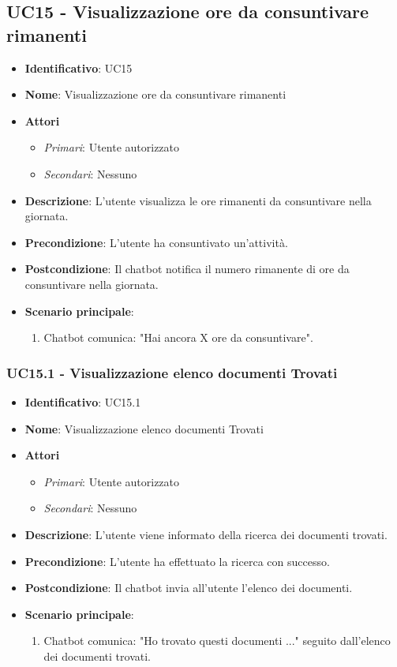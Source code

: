 \subsection{UC15 - Visualizzazione ore da consuntivare rimanenti }
\begin{itemize}
	\item \textbf{Identificativo}: UC15
	\item \textbf{Nome}: Visualizzazione ore da consuntivare rimanenti
	\item \textbf{Attori}
	\begin{itemize} 
		\item \textit{Primari}: Utente autorizzato
		\item \textit{Secondari}: Nessuno
	\end{itemize}
	\item \textbf{Descrizione}: L'utente visualizza le ore rimanenti da consuntivare nella giornata.
	\item \textbf{Precondizione}: L'utente ha consuntivato un'attività.
	\item \textbf{Postcondizione}: Il chatbot notifica il numero rimanente di ore da consuntivare nella giornata.
	\item \textbf{Scenario principale}: \begin{enumerate}
		\item Chatbot comunica: "Hai ancora X ore da consuntivare".
	\end{enumerate}
\end{itemize}
\subsubsection{UC15.1 - Visualizzazione elenco documenti Trovati}
\begin{itemize}
	\item \textbf{Identificativo}: UC15.1
	\item \textbf{Nome}: Visualizzazione elenco documenti Trovati
	\item \textbf{Attori}
	\begin{itemize} 
		\item \textit{Primari}: Utente autorizzato
		\item \textit{Secondari}: Nessuno
	\end{itemize}
	\item \textbf{Descrizione}: L'utente viene informato della ricerca dei documenti trovati.
	\item \textbf{Precondizione}: L'utente ha effettuato la ricerca con successo.
	\item \textbf{Postcondizione}: Il chatbot invia all'utente l'elenco dei documenti.
	\item \textbf{Scenario principale}: \begin{enumerate}
		\item Chatbot comunica: "Ho trovato questi documenti ..." seguito dall'elenco dei documenti trovati.
	\end{enumerate}
\end{itemize}